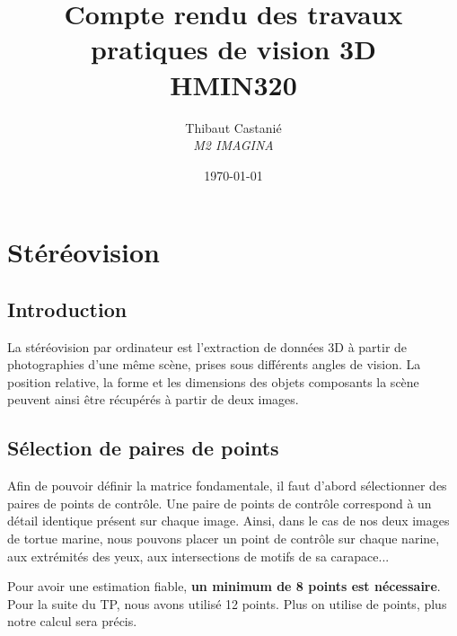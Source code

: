 \documentclass[a4paper,12pt]{article}
\title{\textbf{Compte rendu des travaux \\pratiques de vision 3D}\\HMIN320}
\author{Thibaut Castanié\\\textit{M2 IMAGINA}}
\date{\today}
\begin{document}
\maketitle
\renewcommand{\cftsecleader}{\cftdotfill{\cftdotsep}}
\vspace{2cm}
\thispagestyle{empty}

\newpage 

\setcounter{page}{1}
\section{Stéréovision}
\subsection{Introduction}
La stéréovision par ordinateur est l'extraction de données 3D à partir de photographies d'une même scène, prises sous différents angles de vision. La position relative, la forme et les dimensions des objets composants la scène peuvent ainsi être récupérés à partir de deux images.
\subsection{Sélection de paires de points}
Afin de pouvoir définir la matrice fondamentale, il faut d'abord sélectionner des paires de points de contrôle. Une paire de points de contrôle correspond à un détail identique présent sur chaque image. Ainsi, dans le cas de nos deux images de tortue marine, nous pouvons placer un point de contrôle sur chaque narine, aux extrémités des yeux, aux intersections de motifs de sa carapace... 



Pour avoir une estimation fiable, \textbf{un minimum de 8 points est nécessaire}. Pour la suite du TP, nous avons utilisé 12 points. Plus on utilise de points, plus notre calcul sera précis.
\end{document}
